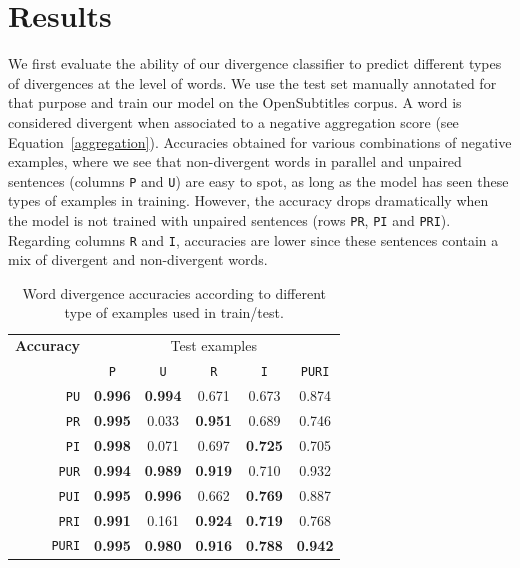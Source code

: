 \documentclass[11pt,a4paper]{article}
\begin{document}
\section{Results}
\label{sec:results}

We first evaluate the ability of our divergence classifier to predict different types of divergences at the level of words. 
We use the test set manually annotated for that purpose and train our model on the OpenSubtitles corpus.
A word is considered divergent when associated to a negative aggregation score (see Equation~\eqref{aggregation}).
Accuracies obtained for various combinations of negative examples, where we see that
non-divergent words in parallel and unpaired sentences (columns \texttt{P} and \texttt{U}) are easy to spot, as long as the model has seen these types of examples in training. 
However, the accuracy drops dramatically when the model is not trained with unpaired sentences (rows  \texttt{PR}, \texttt{PI} and \texttt{PRI}).
Regarding columns \texttt{R} and \texttt{I}, accuracies are lower since these sentences contain a mix of divergent and non-divergent words. 

\begin{table}[h]
\small
\center
\begin{tabular}{crccccc}
\hline
\multicolumn{2}{l}{\bf Accuracy} & \multicolumn{5}{c}{Test examples} \\
 &  & \texttt{P} & \texttt{U} & \texttt{R} & \texttt{I} & \texttt{PURI} \\
 \hline
\parbox[t]{0mm}{} &  \texttt{PU}     & \bf 0.996 & \bf 0.994 & 0.671 & 0.673 & 0.874 \\
 &  \texttt{PR}     & \bf 0.995 &      0.033 & \bf 0.951 &      0.689 & 0.746 \\
 &  \texttt{PI}       & \bf 0.998 &      0.071 &      0.697 & \bf 0.725 & 0.705 \\
 &  \texttt{PUR}  & \bf 0.994 & \bf 0.989 & \bf 0.919 &      0.710 & 0.932 \\
 &  \texttt{PUI}    & \bf 0.995 & \bf 0.996 &      0.662 & \bf 0.769 & 0.887 \\
 &  \texttt{PRI}    & \bf 0.991 &      0.161 & \bf 0.924 & \bf 0.719 & 0.768 \\
 &  \texttt{PURI} & \bf 0.995 & \bf 0.980 & \bf 0.916 & \bf 0.788 & \bf 0.942 \\
\hline
\end{tabular}
\caption{Word divergence accuracies according to different type of examples used in train/test.}
\label{results_puri}
\end{table}
\end{document}
